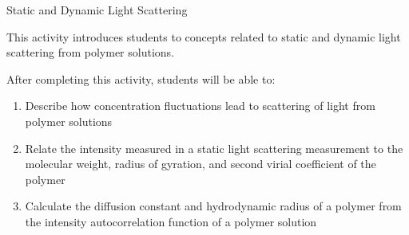 %
%
%
%

\renewcommand{\figpath}{content/polymphys/scattering/light-scattering/figs}
\renewcommand{\labelbase}{light-scattering}

\begin{activity}{Static and Dynamic Light Scattering}
\label{\labelbase}

\begin{instructornotes}
	This activity introduces students to concepts related to static and dynamic light scattering from polymer solutions.
	
	After completing this activity, students will be able to:
	\begin{enumerate}
		\item Describe how concentration fluctuations lead to scattering of light from polymer solutions
		\item Relate the intensity measured in a static light scattering measurement to the molecular weight, radius of gyration, and second virial coefficient of the polymer
		\item Calculate the diffusion constant and hydrodynamic radius of a polymer from the intensity autocorrelation function of a polymer solution
	\end{enumerate}
	

\end{instructornotes}
\end{activity}
